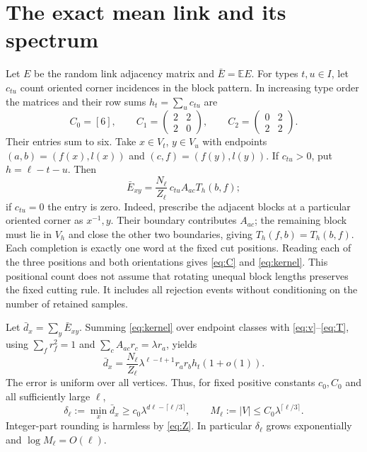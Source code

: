 \documentclass[11pt,letterpaper]{article}
\newcommand{\E}{\mathbb E}
\begin{document}
\section{The exact mean link and its spectrum}
Let $E$ be the random link adjacency matrix and $\bar E=\E E$. For types $t,u\in I$, let $c_{tu}$ count oriented corner incidences in the block pattern. In increasing type order the matrices and their row sums $h_t=\sum_u c_{tu}$ are
\begin{equation}\label{eq:C}
 C_0=[6],\qquad C_1=\begin{pmatrix}2&2\\2&0\end{pmatrix},
 \qquad C_2=\begin{pmatrix}0&2\\2&2\end{pmatrix}.
\end{equation}
Their entries sum to six. Take $x\in V_t$, $y\in V_u$ with endpoints $(a,b)=(f(x),l(x))$ and $(c,f)=(f(y),l(y))$. If $c_{tu}>0$, put $h=\ell-t-u$. Then
\begin{equation}\label{eq:kernel}
 \bar E_{xy}=\frac{N_\ell}{Z_\ell}\,c_{tu}A_{ac}T_h(b,f);
\end{equation}
if $c_{tu}=0$ the entry is zero. Indeed, prescribe the adjacent blocks at a particular oriented corner as $x^{-1},y$. Their boundary contributes $A_{ac}$; the remaining block must lie in $V_h$ and close the other two boundaries, giving $T_h(f,b)=T_h(b,f)$. Each completion is exactly one word at the fixed cut positions. Reading each of the three positions and both orientations gives \eqref{eq:C} and \eqref{eq:kernel}. This positional count does not assume that rotating unequal block lengths preserves the fixed cutting rule. It includes all rejection events without conditioning on the number of retained samples.

Let $\bar d_x=\sum_y\bar E_{xy}$. Summing \eqref{eq:kernel} over endpoint classes with \eqref{eq:v}--\eqref{eq:T}, using $\sum_f r_f^2=1$ and $\sum_c A_{ac}r_c=\lambda r_a$, yields
\begin{equation}\label{eq:degree}
 \bar d_x=\frac{N_\ell}{Z_\ell}\lambda^{\ell-t+1}r_a r_b h_t(1+o(1)).
\end{equation}
The error is uniform over all vertices. Thus, for fixed positive constants $c_0,C_0$ and all sufficiently large $\ell$,
\begin{equation}\label{eq:growth}
 \delta_\ell:=\min_x\bar d_x\geq c_0\lambda^{d\ell-\lceil\ell/3\rceil},
 \qquad M_\ell:=|V|\leq C_0\lambda^{\lceil\ell/3\rceil}.
\end{equation}
Integer-part rounding is harmless by \eqref{eq:Z}. In particular $\delta_\ell$ grows exponentially and $\log M_\ell=O(\ell)$.
\end{document}

